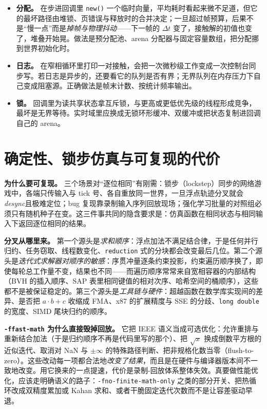 \documentclass[12pt,a4paper,fontset=fandol]{ctexbook}
\newcommand{\Fn}[1]{\texttt{#1()}}
\newcommand{\Tp}[1]{\texttt{#1}}
\begin{document}
\begin{warning}[title={回调域里的分配、日志与锁}]
\begin{itemize}
\item \textbf{分配。} 在步进回调里 \Fn{new} 一个临时向量，平均耗时看起来微不足道，但它的最坏路径由堆锁、页错误与释放时的合并决定；一旦超过帧预算，后果不是``慢一点''而是\emph{掉帧与物理抖动}——下一帧的 $\Delta t$ 变了，接触解的初值也变了，堆叠开始晃。做法是预分配池、arena 分配器与固定容量数组，把分配挪到世界初始化时。
\item \textbf{日志。} 在窄相循环里打印一对接触，会把一次微秒级工作变成一次控制台同步写。若日志是异步的，还要看它的队列是否有界；无界队列在内存压力下自己变成阻塞源。正确做法是帧末计数、按统计频率输出。
\item \textbf{锁。} 回调里为读共享状态拿互斥锁，与更高或更低优先级的线程形成竞争，最坏是无界等待。实时域里应换成无锁环形缓冲、双缓冲或把状态复制进回调自己的 arena。
\end{itemize}
\end{warning}

\section{确定性、锁步仿真与可复现的代价}

\textbf{为什么要可复现。} 三个场景对``逐位相同''有刚需：锁步（lockstep）同步的网络游戏中，各端只传输入与 tick 号、各自重放同一世界，一旦浮点轨迹分叉就会\emph{desync}且极难定位；bug 复现靠录制输入序列回放现场；强化学习批量的对照组必须只有随机种子在变。这三件事共同的隐含要求是：仿真函数在相同状态与相同输入下返回逐位相同的结果。

\textbf{分叉从哪里来。} 第一个源头是\emph{求和顺序}：浮点加法不满足结合律，于是任何并行归约、任务窃取、线程数变化、\Tp{reduction} 式的分块都会改变最后几位。第二个源头是\emph{迭代式求解器对顺序的敏感}：序贯冲量逐条约束投影，约束遍历顺序换了，即使每轮总工作量不变，结果也不同——而遍历顺序常常来自宽相容器的内部结构（BVH 的插入顺序、SAP 表里相同键值的相对次序、哈希空间的桶顺序），这些都不是被保证稳定的。第三个源头是\emph{工具链与硬件}：超越函数在数学库实现间的差异、是否把 $a\cdot b+c$ 收缩成 FMA、x87 的扩展精度与 SSE 的分歧、\Tp{long double} 的宽度、SIMD 尾块归约的顺序。

\textbf{\Tp{-ffast-math} 为什么直接毁掉回放。} 它把 IEEE 语义当成可选优化：允许重排与重新结合加法（于是归约顺序不再是代码里写的那个）、把 $\sqrt{x}$ 换成倒数平方根的近似迭代、取消对 NaN 与 $\pm\infty$ 的特殊路径判断、把非规格化数当零（flush-to-zero）。这些改动每一项都合法地\emph{改变了结果}，而且是在硬件与编译器版本间不一致地改变。用它换来的一点提速，代价是录制-回放体系整体失效。真要做性能优化，应该走明确语义的路子：\Tp{-fno-finite-math-only} 之类的部分开关、把热循环改成双精度累加或 Kahan 求和、或者干脆固定迭代次数而不是让容差驱动早退。
\end{document}
